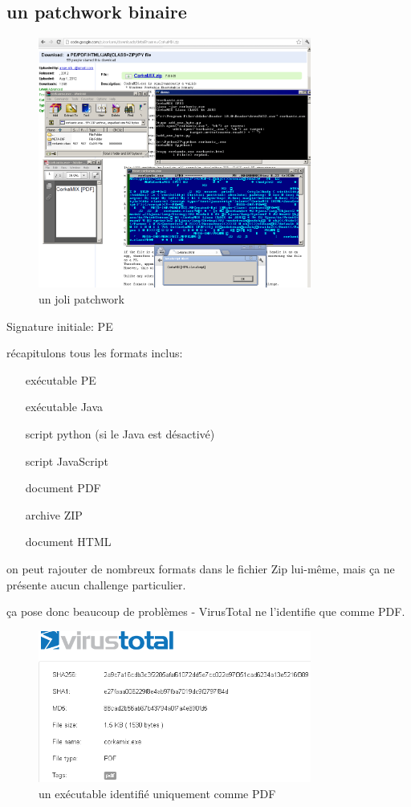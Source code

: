 \subsection{un patchwork binaire}
\begin{figure}[ht]
  \centering
  \includegraphics[width=0.8\textwidth]{albertini/img/corkamix}
  \caption{un joli patchwork}
  \label{fig:albertini:corkamix}
\end{figure}

Signature initiale: PE

récapitulons tous les formats inclus:
\begin{itemize}
\item[exécutable] PE
\item[exécutable] Java
\item[script] python (si le Java est désactivé)
\item[script] JavaScript
\item[document] PDF
\item[archive] ZIP
\item[document] HTML
\end{itemize}

on peut rajouter de nombreux formats dans le fichier Zip lui-même, mais ça ne présente aucun challenge particulier.

ça pose donc beaucoup de problèmes - VirusTotal ne l'identifie que comme PDF.
\begin{figure}[ht]
  \centering
  \includegraphics[width=0.8\textwidth]{albertini/img/corkamix-vt}
  \caption{un exécutable identifié uniquement comme PDF}
  \label{fig:albertini:corkamix-vt}
\end{figure}

